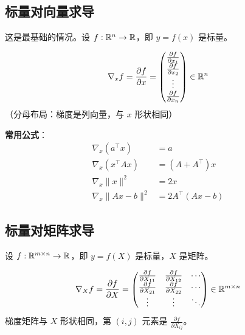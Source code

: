 \subsection*{标量对向量求导}

这是最基础的情况。设 $f: \mathbb{R}^n \to \mathbb{R}$，即 $y = f(x)$ 是标量。

\begin{keyformula}[title=标量对向量的梯度]
\begin{equation}
\nabla_x f = \frac{\partial f}{\partial x} = \begin{pmatrix}
\frac{\partial f}{\partial x_1} \\
\frac{\partial f}{\partial x_2} \\
\vdots \\
\frac{\partial f}{\partial x_n}
\end{pmatrix} \in \mathbb{R}^n
\end{equation}
（分母布局：梯度是列向量，与 $x$ 形状相同）
\end{keyformula}

\textbf{常用公式}：
\begin{align}
\nabla_x (a^\top x) &= a \\
\nabla_x (x^\top A x) &= (A + A^\top) x \\
\nabla_x \|x\|^2 &= 2x \\
\nabla_x \|Ax - b\|^2 &= 2A^\top(Ax - b)
\end{align}

\subsection*{标量对矩阵求导}

设 $f: \mathbb{R}^{m \times n} \to \mathbb{R}$，即 $y = f(X)$ 是标量，$X$ 是矩阵。

\begin{keyformula}[title=标量对矩阵的梯度]
\begin{equation}
\nabla_X f = \frac{\partial f}{\partial X} = \begin{pmatrix}
\frac{\partial f}{\partial X_{11}} & \frac{\partial f}{\partial X_{12}} & \cdots \\
\frac{\partial f}{\partial X_{21}} & \frac{\partial f}{\partial X_{22}} & \cdots \\
\vdots & \vdots & \ddots
\end{pmatrix} \in \mathbb{R}^{m \times n}
\end{equation}
梯度矩阵与 $X$ 形状相同，第 $(i,j)$ 元素是 $\frac{\partial f}{\partial X_{ij}}$。
\end{keyformula}

